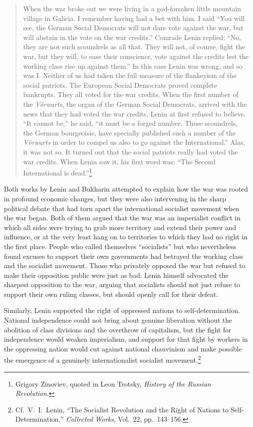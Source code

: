 \blockquote{When the war broke out we were living in a god-forsaken little mountain village in Galicia. I remember having had a bet with him. I said ``You will see, the German Social Democrats will not dare vote against the war, but will abstain in the vote on the war credits.'' Comrade Lenin replied: ``No, they are not such scoundrels as all that. They will not, of course, fight the war, but they will, to ease their conscience, vote against the credits lest the working class rise up against them.'' In this case Lenin was wrong, and so was I. Neither of us had taken the full measure of the flunkeyism of the social patriots. The European Social Democrats proved complete bankrupts. They all voted for the war credits. When the first number of the \emph{V\"orwarts}, the organ of the German Social Democrats, arrived with the news that they had voted the war credits, Lenin at first refused to believe. ``It cannot be,'' he said, ``it must be a forged number. Those scoundrels, the German bourgeoisie, have specially published such a number of the \emph{V\"orwarts} in order to compel us also to go against the International.'' Alas, it was not so. It turned out that the social patriots really had voted the war credits. When Lenin saw it, his first word was: ``The Second International is dead.''\footnote{Grigory Zinoviev, quoted in Leon Trotsky, \emph{History of the Russian Revolution}.}}

Both works by Lenin and Bukharin attempted to explain how the war was rooted in profound economic changes, but they were also intervening in the sharp political debate that had torn apart the international socialist movement when the war began. Both of them argued that the war was an imperialist conflict in which all sides were trying to grab more territory and extend their power and influence, or at the very least hang on to territories to which they had no right in the first place. People who called themselves ``socialists'' but who nevertheless found excuses to support their own governments had betrayed the working class and the socialist movement. Those who privately opposed the war but refused to make their opposition public were just as bad. Lenin himself advocated the sharpest opposition to the war, arguing that socialists should not just refuse to support their own ruling classes, but should openly call for their defeat.

Similarly, Lenin supported the right of oppressed nations to self-determination. National independence could not bring about genuine liberation without the abolition of class divisions and the overthrow of capitalism, but the fight for independence would weaken imperialism, and support for that fight by workers in the oppressing nation would cut against national chauvinism and make possible the emergence of a genuinely internationalist socialist movement.\footnote{Cf.\ V.\ I.\ Lenin, ``The Socialist Revolution and the Right of Nations to Self-Determination,'' \emph{Collected Works}, Vol.\ 22, pp.\ 143--156.}

